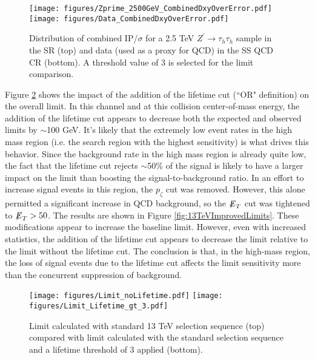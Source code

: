 \begin{figure}[tbh!]
\centering
\texttt{[image: figures/Zprime\_2500GeV\_CombinedDxyOverError.pdf]}
\texttt{[image: figures/Data\_CombinedDxyOverError.pdf]}
\caption{Distribution of combined IP/$\sigma$ for a 2.5 TeV $Z^\prime\to\tau_h\tau_h$ sample in the SR (top) and data (used as a proxy for QCD) in the SS QCD CR (bottom). A threshold value of 3 is selected for the limit comparison.}
\label{fig:13TeVComparison}
\end{figure}

Figure \ref{fig:13TeVLifetimeLimits} shows the impact of the addition of the lifetime cut (``OR" definition) on the overall limit. In this channel and at this collision center-of-mass energy, the addition of the lifetime cut appears to decrease both the expected and observed limits by $\sim$100 GeV. It's likely that the extremely low event rates in the high mass region (i.e. the search region with the highest sensitivity) is what drives this behavior. Since the background rate in the high mass region is already quite low, the fact that the lifetime cut rejects $\sim$50\% of the signal is likely to have a larger impact on the limit than boosting the signal-to-background ratio. In an effort to increase signal events in this region, the $p_\zeta$ cut was removed. However, this alone permitted a significant increase in QCD background, so the ${\not\mathrel{E}}_T$ cut was tightened to ${\not\mathrel{E}}_T > 50$. The results are shown in Figure \ref{fig:13TeVImprovedLimits}. These modifications appear to increase the baseline limit. However, even with increased statistics, the addition of the lifetime cut appears to decrease the limit relative to the limit without the lifetime cut. The conclusion is that, in the high-mass region, the loss of signal events due to the lifetime cut affects the limit sensitivity more than the concurrent suppression of background.

\begin{figure}[tbh!]
\centering
\texttt{[image: figures/Limit\_noLifetime.pdf]}
\texttt{[image: figures/Limit\_Lifetime\_gt\_3.pdf]}
\caption{Limit calculated with standard 13 TeV selection sequence (top) compared with limit calculated with the standard selection sequence and a lifetime threshold of 3 applied (bottom).}
\label{fig:13TeVLifetimeLimits}
\end{figure}

